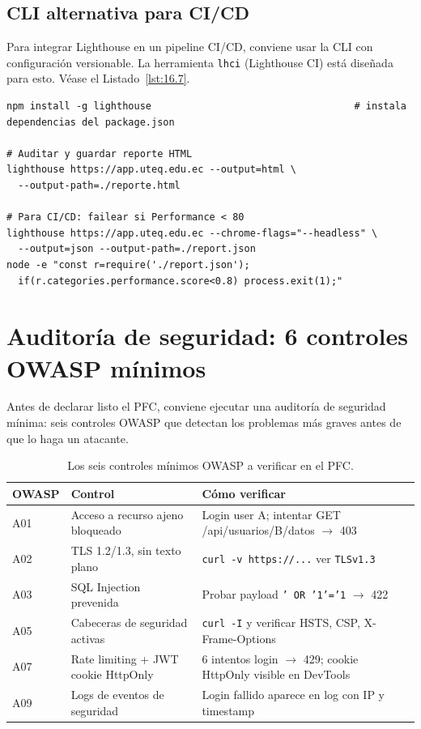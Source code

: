\documentclass[11pt,a4paper,openany]{book}
\begin{document}
\subsection{CLI alternativa para CI/CD}

Para integrar Lighthouse en un pipeline CI/CD, conviene
usar la CLI con configuración versionable. La herramienta \texttt{lhci}
(Lighthouse CI) está diseñada para esto. V\'ease el Listado~\ref{lst:16.7}.


\begin{lstlisting}[style=shell,numbers=none,caption={Ejemplo de Shell},label=lst:16.7]
npm install -g lighthouse                                   # instala dependencias del package.json

# Auditar y guardar reporte HTML
lighthouse https://app.uteq.edu.ec --output=html \
  --output-path=./reporte.html

# Para CI/CD: failear si Performance < 80
lighthouse https://app.uteq.edu.ec --chrome-flags="--headless" \
  --output=json --output-path=./report.json
node -e "const r=require('./report.json');
  if(r.categories.performance.score<0.8) process.exit(1);"
\end{lstlisting}

\section{Auditoría de seguridad: 6 controles OWASP mínimos}

Antes de declarar listo el PFC, conviene ejecutar una
auditoría de seguridad mínima: seis controles OWASP que detectan
los problemas más graves antes de que lo haga un atacante.


\begin{table}[htbp]
\centering
\caption{Los seis controles mínimos OWASP a verificar en el PFC.}
\footnotesize
\begin{tabularx}{\textwidth}{lXX}
\toprule
\textbf{OWASP} & \textbf{Control} & \textbf{Cómo verificar}\\
\midrule
A01 & Acceso a recurso ajeno bloqueado & Login user A; intentar GET /api/usuarios/B/datos $\to$ 403\\
A02 & TLS 1.2/1.3, sin texto plano & \texttt{curl -v https://...} ver \texttt{TLSv1.3}\\
A03 & SQL Injection prevenida & Probar payload \texttt{' OR '1'='1} $\to$ 422\\
A05 & Cabeceras de seguridad activas & \texttt{curl -I} y verificar HSTS, CSP, X-Frame-Options\\
A07 & Rate limiting + JWT cookie HttpOnly & 6 intentos login $\to$ 429; cookie HttpOnly visible en DevTools\\
A09 & Logs de eventos de seguridad & Login fallido aparece en log con IP y timestamp\\
\bottomrule
\end{tabularx}
\end{table}
\end{document}

